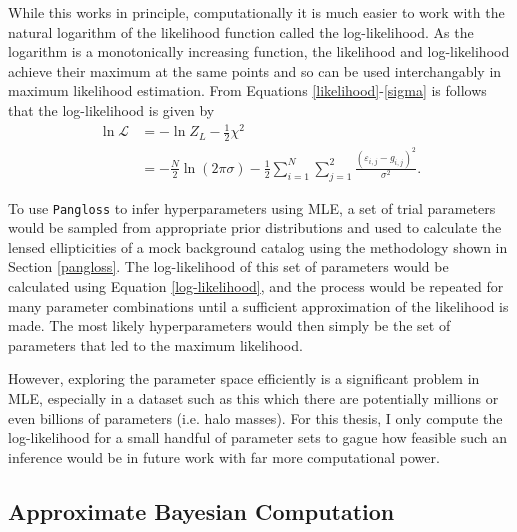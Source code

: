 \documentclass[%
 reprint,
 amsmath,amssymb,
 aps,nofootinbib
]{revtex4-1}
\begin{document}
While this works in principle, computationally it is much easier to work with the natural logarithm of the likelihood function called the log-likelihood. As the logarithm is a monotonically increasing function, the likelihood and log-likelihood achieve their maximum at the same points and so can be used interchangably in maximum likelihood estimation. From Equations \eqref{likelihood}-\eqref{sigma} is follows that the log-likelihood is given by
\begin{align}\label{log-likelihood}
\ln\mathcal{L}&=-\ln Z_L-\frac{1}{2}\chi^2\nonumber \\
&=-\frac{N}{2}\ln(2\pi\sigma)-\frac{1}{2}\sum_{i=1}^N\sum_{j=1}^2\frac{(\varepsilon_{i,j}-g_{i,j})^2}{\sigma^2}.
\end{align}

To use \texttt{Pangloss} to infer hyperparameters using MLE, a set of trial parameters would be sampled from appropriate prior distributions and used to calculate the lensed ellipticities of a mock background catalog using the methodology shown in Section \ref{pangloss}. The log-likelihood of this set of parameters would be calculated using Equation \eqref{log-likelihood}, and the process would be repeated for many parameter combinations until a sufficient approximation of the likelihood is made. The most likely hyperparameters would then simply be the set of parameters that led to the maximum likelihood.

However, exploring the parameter space efficiently is a significant problem in MLE, especially in a dataset such as this which there are potentially millions or even billions of parameters (i.e. halo masses). For this thesis, I only compute the log-likelihood for a small handful of parameter sets to gague how feasible such an inference would be in future work with far more computational power.

\subsection{Approximate Bayesian Computation} \label{abc}
\end{document}

